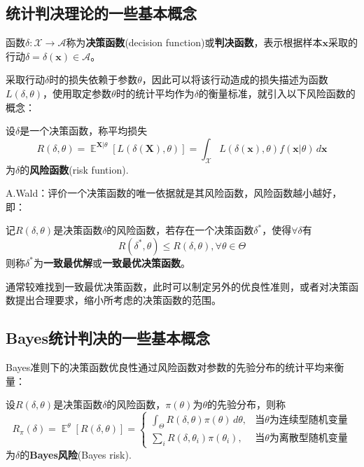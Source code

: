 \documentclass{ctexbook}
\DeclareMathOperator{\E}{\mathbb{E}}     %
\begin{document}
\subsection{统计判决理论的一些基本概念}

\begin{definition}[决策函数]
    函数$\delta:\mathcal{X}\to\mathcal{A}$称为\textbf{决策函数}(decision function)或\textbf{判决函数}，表示根据样本$\mathbf{x}$采取的行动$\delta=\delta(\mathbf{x})\in\mathcal{A}$。
\end{definition}

采取行动$\delta$时的损失依赖于参数$\theta$，因此可以将该行动造成的损失描述为函数$L(\delta,\theta)$，使用取定参数$\theta$时的统计平均作为$\delta$的衡量标准，就引入以下风险函数的概念：

\begin{definition}[风险函数]
    设$\delta$是一个决策函数，称平均损失
    $$R(\delta,\theta)=\E^{\mathbf{X}|\theta}[L(\delta(\mathbf{X}),\theta)]=\int_{\mathcal{X}}L(\delta(\mathbf{x}),\theta)f(\mathbf{x}|\theta)\,d\mathbf{x}$$
    为$\delta$的\textbf{风险函数}(risk funtion).
\end{definition}

A.Wald：评价一个决策函数的唯一依据就是其风险函数，风险函数越小越好，即：

\begin{definition}[一致最优决策函数]
    记$R(\delta,\theta)$是决策函数$\delta$的风险函数，若存在一个决策函数$\delta^*$，使得$\forall \delta$有
    $$R(\delta^*,\theta)\le R(\delta,\theta),\forall\theta\in\Theta$$
    则称$\delta^*$为\textbf{一致最优解}或\textbf{一致最优决策函数}。
\end{definition}

通常较难找到一致最优决策函数，此时可以制定另外的优良性准则，或者对决策函数提出合理要求，缩小所考虑的决策函数的范围。

\subsection{Bayes统计判决的一些基本概念}

Bayes准则下的决策函数优良性通过风险函数对参数的先验分布的统计平均来衡量：

\begin{definition}[Bayes风险]
    设$R(\delta,\theta)$是决策函数$\delta$的风险函数，$\pi(\theta)$为$\theta$的先验分布，则称
    $$R_\pi(\delta)=\E^\theta[R(\delta,\theta)]=\begin{cases}
        \int_{\Theta}R(\delta,\theta)\pi(\theta)\,d\theta,&\text{当}\theta\text{为连续型随机变量}\\
        \sum_{i}R(\delta,\theta_i)\pi(\theta_i),&\text{当}\theta\text{为离散型随机变量}
    \end{cases}$$
    为$\delta$的\textbf{Bayes风险}(Bayes risk).
\end{definition}
\end{document}
